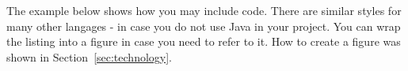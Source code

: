 The example below shows how you may include code. There are similar
styles for many other langages - in case you do not use Java in your
project. You can wrap the listing into a figure in case you need to
refer to it. How to create a figure was shown in Section~\ref{sec:technology}.


